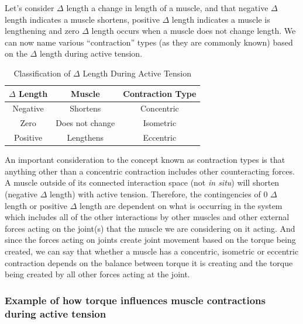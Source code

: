 Let’s consider $\Delta$ length a change in length of a muscle, \footnotemark{} and that negative $\Delta$ length indicates a muscle shortens, positive $\Delta$ length indicates a muscle is lengthening and zero $\Delta$ length occurs when a muscle does not change length. We can now name various “contraction” types (as they are commonly known) based on the $\Delta$ length during active tension. 

\begin{table}[h!]
\centering
\begin{tabular}{||c c c ||} 
 \hline
 $\Delta$ Length & Muscle & Contraction Type \\ [0.5ex] 
 \hline\hline
 Negative & Shortens & Concentric \\
 Zero & Does not change & Isometric \\[1ex] 
 Positive & Lengthens & Eccentric \\[1ex] 
 \hline
\end{tabular}
\caption{Classification of $\Delta$ Length During Active Tension}
\label{table:contraction_types}
\end{table}


An important consideration to the concept known as contraction types is that anything other than a concentric contraction includes other counteracting forces. A muscle outside of its connected interaction space (not \textit{in situ}) will shorten (negative $\Delta$ length) with active tension.\footnotemark{}  Therefore, the contingencies of 0 $\Delta$ length or positive $\Delta$ length are dependent on what is occurring in the system which includes all of the other interactions by other muscles and other external forces acting on the joint(s) that the muscle we are considering on it acting. And since the forces acting on joints create joint movement based on the torque being created, we can say that whether a muscle has a concentric, isometric or eccentric contraction depends on the balance between torque it is creating and the torque being created by all other forces acting at the joint.

\subsubsection{Example of how torque influences muscle contractions during active tension}

